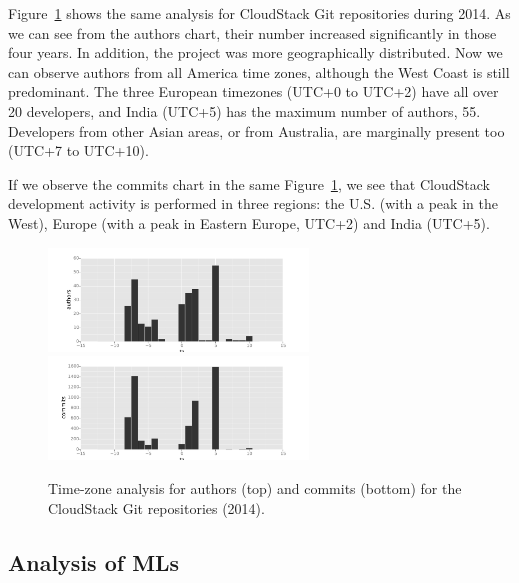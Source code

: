 \documentclass{sig-alternate-05-2015}
\begin{document}
Figure~\ref{fig:2014-scm} shows the same analysis for CloudStack Git repositories during 2014. As we can see from the authors chart, their number increased significantly in those four years. In addition, the project was more geographically distributed. Now we can observe authors from all America time zones, although the West Coast is still predominant. The three European timezones (UTC+0 to UTC+2) have all over 20 developers, and India (UTC+5) has the maximum number
of authors, 55. Developers from other Asian areas, or from Australia, are marginally present too (UTC+7 to UTC+10).

If we observe the commits chart in the same Figure~\ref{fig:2014-scm}, we see that CloudStack development activity is performed in three regions: the U.S. (with a peak in the West), Europe (with a peak in Eastern Europe, UTC+2) and India (UTC+5).

\begin{figure}[!h]
\centering
\includegraphics[width=6.9cm]{figs/cloudstack/tz-scm-authors-2014.pdf}
\includegraphics[width=6.9cm]{figs/cloudstack/tz-scm-commits-2014.pdf}
\caption{Time-zone analysis for authors (top) and commits (bottom) for
the CloudStack Git repositories (2014).}
\label{fig:2014-scm}
\end{figure}


\subsection{Analysis of MLs}
\end{document}
